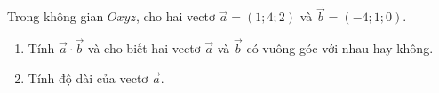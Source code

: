 \begin{vd}%
	Trong không gian $Oxyz$, cho hai vectơ $\vec{a}=(1;4;2)$ và $\vec{b}=(-4;1;0)$.
	\begin{enumerate}
		\item Tính $\vec{a} \cdot \vec{b}$ và cho biết hai vectơ $\vec{a}$ và $\vec{b}$ có vuông góc với nhau hay không.
		\item Tính độ dài của vectơ $\overrightarrow{a}$.
	\end{enumerate}
\end{vd}

